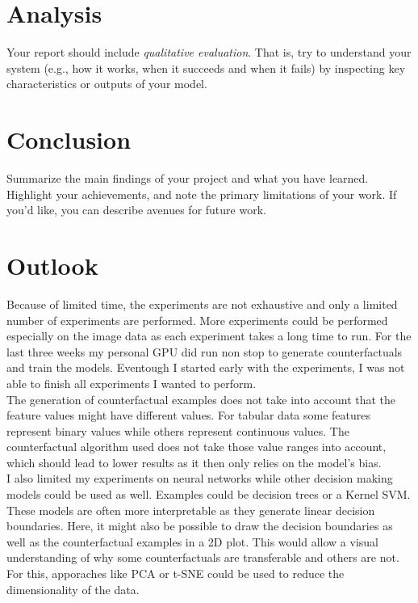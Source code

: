 \documentclass{article}
\begin{document}
\section{Analysis}
Your report should include \textit{qualitative evaluation}. That is, try to understand your system (e.g., how it works, when it succeeds and when it fails) by inspecting key characteristics or outputs of your model.

\section{Conclusion}
Summarize the main findings of your project and what you have learned. Highlight your achievements, and note the primary limitations of your work. If you'd like, you can describe avenues for future work.

\section{Outlook}
Because of limited time, the experiments are not exhaustive and only a limited number of experiments are performed. More experiments could be performed especially on the image data as each experiment takes a long time to run. For the last three weeks my personal GPU did run non stop to generate counterfactuals and train the models. Eventough I started early with the experiments, I was not able to finish all experiments I wanted to perform. \\
The generation of counterfactual examples does not take into account that the feature values might have different values. For tabular data some features represent binary values while others represent continuous values. The counterfactual algorithm used does not take those value ranges into account, which should lead to lower results as it then only relies on the model's bias. \\
I also limited my experiments on neural networks while other decision making models could be used as well. Examples could be decision trees or a Kernel SVM. These models are often more interpretable as they generate linear decision boundaries. Here, it might also be possible to draw the decision boundaries as well as the counterfactual examples in a 2D plot. This would allow a visual understanding of why some counterfactuals are transferable and others are not. For this, apporaches like PCA or t-SNE could be used to reduce the dimensionality of the data. \\



\end{document}

